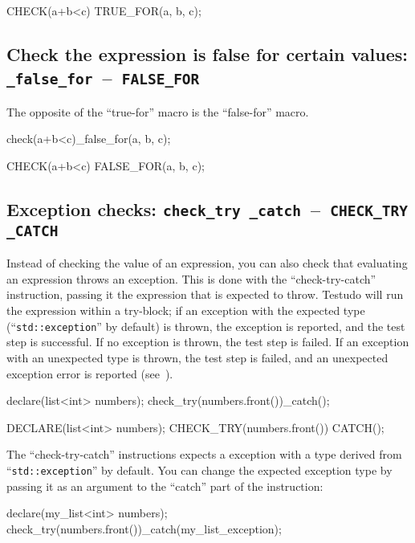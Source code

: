 \documentclass[twoside, a4paper, article]{memoir}
\newcommand*\testudocolor{\color{red!80!blue}}
\newcommand*\testudo[1]{\texttt{\testudocolor{}#1}}
\newcommand*\testudopair[2]{\testudo{#1}~--~\testudo{#2}}
\newcommand\subsectiontestudopair[3]{%
  \subsection[#1]{#1: \testudopair{#2}{#3}}}
\begin{document}
\begin{cpplisting}
CHECK(a+b<c) TRUE_FOR(a, b, c);
\end{cpplisting}

\subsectiontestudopair{Check the expression is false for certain values}%
{\_false\_for}{FALSE\_FOR}
\label{sec:check-expression-false-for}

The opposite of the ``true-for'' macro is the ``false-for'' macro.

\begin{cpplisting}
check(a+b<c)_false_for(a, b, c);
\end{cpplisting}

\begin{cpplisting}
CHECK(a+b<c) FALSE_FOR(a, b, c);
\end{cpplisting}


\subsectiontestudopair{Exception checks}%
  {check\_try \_catch}{CHECK\_TRY \_CATCH}
\label{sec:exception-checks}

Instead of checking the value of an expression, you can also check that
evaluating an expression throws an exception.  This is done with the
``check-try-catch'' instruction, passing it the expression that is expected to
throw.  Testudo will run the expression within a try-block; if an exception
with the expected type (``\texttt{std::exception}'' by default) is thrown, the
exception is reported, and the test step is successful.  If no exception is
thrown, the test step is failed. If an exception with an unexpected type is
thrown, the test step is failed, and an unexpected exception error is reported
(see~).

\begin{cpplisting}
declare(list<int> numbers);
check_try(numbers.front())_catch();
\end{cpplisting}

\begin{cpplisting}
DECLARE(list<int> numbers);
CHECK_TRY(numbers.front()) CATCH();
\end{cpplisting}

The ``check-try-catch'' instructions expects a exception with a type derived
from ``\texttt{std::exception}'' by default.  You can change the expected
exception type by passing it as an argument to the ``catch'' part of the
instruction:
\begin{cpplisting}
declare(my_list<int> numbers);
check_try(numbers.front())_catch(my_list_exception);
\end{cpplisting}
\end{document}
